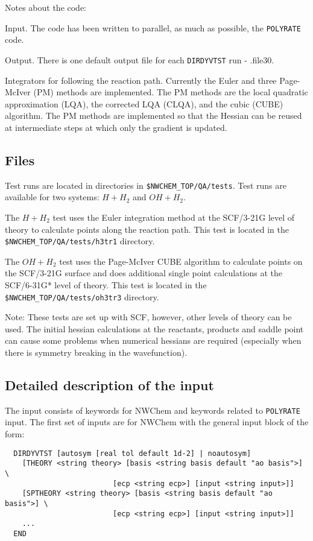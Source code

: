 Notes about the code:

Input.  The code has been written to parallel, as much as possible,
the \verb+POLYRATE+ code.  

Output.  There is one default output file for each \verb+DIRDYVTST+ run - .file30.

Integrators for following the reaction path.  
Currently the Euler and three Page-McIver (PM) methods 
are implemented.  The PM methods are the local quadratic approximation 
(LQA), the corrected LQA (CLQA), and the cubic (CUBE) algorithm.
The PM methods are implemented so that the Hessian can be reused at
intermediate steps at which only the gradient is updated.  


\subsection{Files}

Test runs are located in directories in \verb+$NWCHEM_TOP/QA/tests+.  Test 
runs are available for two systems: $H + H_2$ and $OH + H_2$.

The $H + H_2$ test uses the Euler integration method at the SCF/3-21G level
of theory to calculate points along the reaction path.
This test is located in the \verb+$NWCHEM_TOP/QA/tests/h3tr1+ directory.

The $OH + H_2$ test uses the Page-McIver CUBE algorithm to calculate points
on the SCF/3-21G surface and does additional single point calculations at
the SCF/6-31G* level of theory.  This test is located in the
\verb+$NWCHEM_TOP/QA/tests/oh3tr3+ directory.

Note: These tests are set up with SCF, however, other levels of
theory can be used.  The initial hessian calculations at the reactants,
products and saddle point can cause some problems when numerical hessians
are required (especially when there is symmetry breaking in the wavefunction).

\subsection{Detailed description of the input}

The input consists of keywords for NWChem and keywords related to \verb+POLYRATE+
input.  The first set of inputs are for NWChem with the general input block
of the form:

\begin{verbatim}
  DIRDYVTST [autosym [real tol default 1d-2] | noautosym]
    [THEORY <string theory> [basis <string basis default "ao basis">] \
                         [ecp <string ecp>] [input <string input>]]
    [SPTHEORY <string theory> [basis <string basis default "ao basis">] \
                         [ecp <string ecp>] [input <string input>]]
    ...
  END
\end{verbatim}

